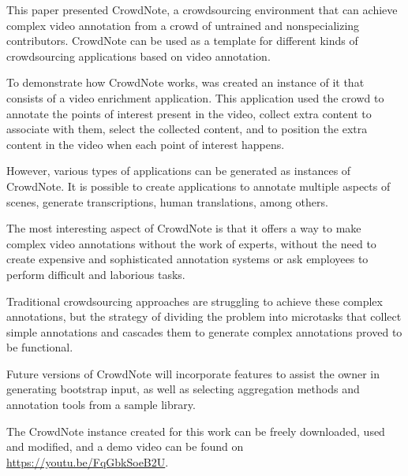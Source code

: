 This paper presented CrowdNote, a crowdsourcing environment that can achieve complex video annotation from a crowd of untrained and nonspecializing contributors. CrowdNote can be used as a template for different kinds of crowdsourcing applications based on video annotation.

To demonstrate how CrowdNote works, was created an instance of it that consists of a video enrichment application. This application used the crowd to annotate the points of interest present in the video, collect extra content to associate with them, select the collected content, and to position the extra content in the video when each point of interest happens.

However, various types of applications can be generated as instances of CrowdNote. It is possible to create applications to annotate multiple aspects of scenes, generate transcriptions, human translations, among others.

The most interesting aspect of CrowdNote is that it offers a way to make complex video annotations without the work of experts, without the need to create expensive and sophisticated annotation systems or ask employees to perform difficult and laborious tasks.

Traditional crowdsourcing approaches are struggling to achieve these complex annotations, but the strategy of dividing the problem into microtasks that collect simple annotations and cascades them to generate complex annotations proved to be functional.

Future versions of CrowdNote will incorporate features to assist the owner in generating bootstrap input, as well as selecting aggregation methods and annotation tools from a sample library.

The CrowdNote instance created for this work can be freely downloaded, used and modified, and a demo video can be found on \href{https://youtu.be/FqGbkSoeB2U}{https://youtu.be/FqGbkSoeB2U}.


